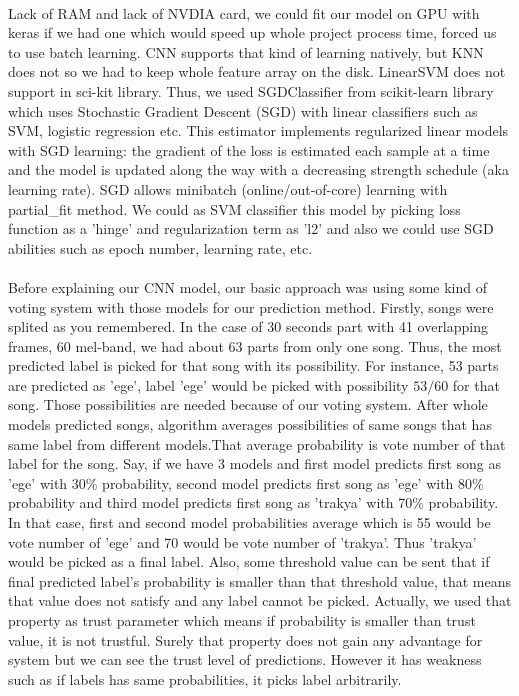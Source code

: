 \documentclass[10pt,twocolumn,letterpaper]{article}
\begin{document}
  \paragraph{} Lack of RAM and lack of NVDIA card, we could fit our model on GPU with keras if we had one which would speed up whole project process time, forced us to use batch learning. CNN supports that kind of learning natively, but KNN does not so we had to keep whole feature array on the disk. LinearSVM does not support in sci-kit library. Thus, we used SGDClassifier from scikit-learn library which uses Stochastic Gradient Descent (SGD) with linear classifiers such as SVM, logistic regression etc. This estimator implements regularized linear models with SGD learning: the gradient of the loss is estimated each sample at a time and the model is updated along the way with a decreasing strength schedule (aka learning rate). SGD allows minibatch (online/out-of-core) learning with partial\_fit method. We could as SVM classifier this model by picking loss function as a 'hinge' and regularization term as 'l2' and also we could use SGD abilities such as epoch number, learning rate, etc. 
  
  \paragraph{} Before explaining our CNN model, our basic approach was using some kind of voting system with those models for our prediction method. Firstly, songs were splited as you remembered. In the case of 30 seconds part with 41 overlapping frames, 60 mel-band, we had about 63 parts from only one song. Thus, the most predicted label is picked for that song with its possibility. For instance, 53 parts are predicted as 'ege', label 'ege' would be picked with possibility $53/60$ for that song. Those possibilities are needed because of our voting system. After whole models predicted songs, algorithm averages possibilities of same songs that has same label from different models.That average probability is vote number of that label for the song. Say, if we have 3 models and first model predicts first song as 'ege' with 30\% probability, second model predicts first song as 'ege' with 80\% probability and third model predicts first song as 'trakya' with 70\% probability. In that case, first and second model probabilities average which is 55 would be vote number of 'ege' and 70 would be vote number of 'trakya'. Thus 'trakya' would be picked as a final label. Also, some threshold value can be sent that if final predicted label's probability is smaller than that threshold value, that means that value does not satisfy and any label cannot be picked. Actually, we used that property as trust parameter which means if probability is smaller than trust value, it is not trustful. Surely that property does not gain any advantage for system but we can see the trust level of predictions. However it has weakness such as if labels has same probabilities, it picks label arbitrarily.             
  
\end{document}
